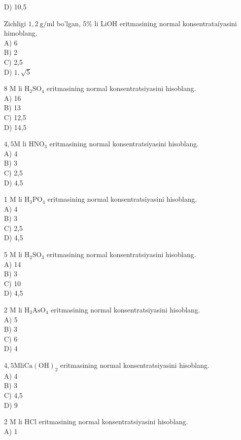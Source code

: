 D) 10,5
  \item Zichligi $1,2 \mathrm{~g} / \mathrm{ml}$ bo'lgan, $5 \%$ li LiOH eritmasining normal konsentrataíyasini himoblang.\\
A) 6\\
B) 2\\
C) 2,5\\
D) $1, \sqrt{5}$
  \item 8 M li $\mathrm{H}_{2} \mathrm{SO}_{4}$ eritmasining normal konsentratsiyasini hisoblang.\\
A) 16\\
B) 13\\
C) 12,5\\
D) 14,5\\
  \item $4,5 \mathrm{M}$ li $\mathrm{HNO}_{3}$ eritmasining normal konsentratsiyasini hisoblang.\\
A) 4\\
B) 3\\
C) 2,5\\
D) 4,5
  \item 1 M li $\mathrm{H}_{3} \mathrm{PO}_{4}$ eritmasining normal konsentratsiyasini hisoblang.\\
A) 4\\
B) 3\\
C) 2,5\\
D) 4,5
  \item 5 M li $\mathrm{H}_{2} \mathrm{SO}_{3}$ eritmasining normal konsentratsiyasini hisoblang.\\
A) 14\\
B) 3\\
C) 10\\
D) 4,5
  \item 2 M li $\mathrm{H}_{3} \mathrm{AsO}_{4}$ eritmasining normal konsentratsiyasini hisoblang.\\
A) 5\\
B) 3\\
C) 6\\
D) 4
  \item $4,5 \mathrm{M} \mathrm{li} \mathrm{Ca}(\mathrm{OH})_{2}$ eritmasining normal konsentratsiyasini hisoblang.\\
A) 4\\
B) 3\\
C) 4,5\\
D) 9
  \item 2 M li HCl eritmasining normal konsentratsiyasini hisoblang.\\
A) 1\\
